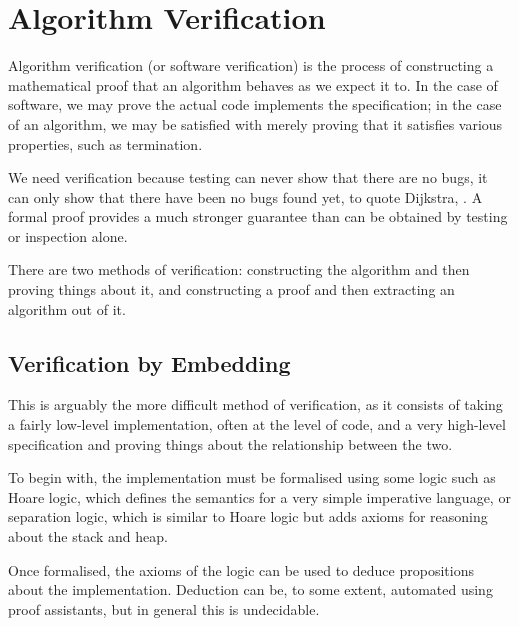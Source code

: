 \section{Algorithm Verification}
\label{sec:lit-verification}

Algorithm verification (or software verification) is the process of
constructing a mathematical proof that an algorithm behaves as we
expect it to\cite{Floyd67}. In the case of software, we may prove the
actual code implements the specification; in the case of an algorithm,
we may be satisfied with merely proving that it satisfies various
properties, such as termination.

We need verification because testing can never show that there are no
bugs, it can only show that there have been no bugs found yet, to
quote Dijkstra, . A formal proof provides a much stronger
guarantee than can be obtained by testing or inspection alone.

There are two methods of verification: constructing the algorithm and
then proving things about it, and constructing a proof and then
extracting an algorithm out of it.

\subsection{Verification by Embedding}
\label{sec:lit-verification-embedding}

This is arguably the more difficult method of verification, as it
consists of taking a fairly low-level implementation, often at the
level of code, and a very high-level specification and proving things
about the relationship between the two.

To begin with, the implementation must be formalised using some logic
such as Hoare logic\cite{Hoare69}, which defines the semantics for a
very simple imperative language, or separation logic\cite{Reynolds02},
which is similar to Hoare logic but adds axioms for reasoning about
the stack and heap.

Once formalised, the axioms of the logic can be used to deduce
propositions about the implementation. Deduction can be, to some
extent, automated using proof assistants, but in general this is
undecidable.


